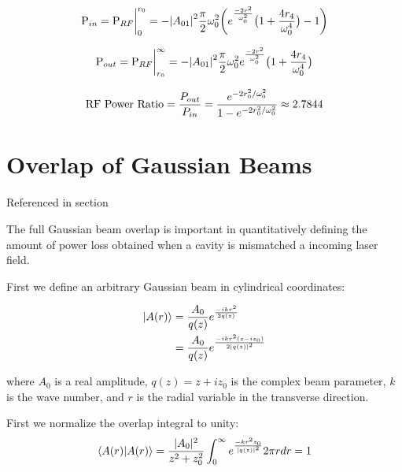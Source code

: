 \begin{appendices}
	\begin{equation}
	\text{P}_{in} \\
	= \text{P}_{RF} \biggr\rvert_0^{r_0} \\
	= - \abs{A_{01}}^2  \frac{\pi}{2} \omega_{0}^2 \bigg( e^{\frac{-2r^2}{\omega_{0}^2}} \big(1 + \frac{4 r_4}{\omega_{0}^4} \big) - 1 \bigg)
	\end{equation}
	
	\begin{equation}
	\text{P}_{out} \\
	= \text{P}_{RF} \biggr\rvert_{r_0}^{\infty}\\ 
	= - \abs{A_{01}}^2  \frac{\pi}{2} \omega_{0}^2 e^{\frac{-2r^2}{\omega_{0}^2}} \big(1 + \frac{4 r_4}{\omega_{0}^4} \big) 
	\end{equation}
	
	\begin{equation}
	\text{RF Power Ratio} 
	= \frac{P_{out}}{P_{in}} \\
	= \frac{e^{-2r_0^2/ \omega_{0}^2}} {1 - e^{-2r_0^2/ \omega_{0}^2 }} \approx 2.7844
	\end{equation}
	
	\chapter{Overlap of Gaussian Beams}
	
	Referenced in section
	
	The full Gaussian beam overlap is important in quantitatively defining the amount of power loss obtained when a cavity is mismatched a incoming laser field.
	
	First we define an arbitrary Gaussian beam in cylindrical coordinates:
	
	\begin{equation}
	\begin{split}
	\ket{A(r)} 
	&= \frac{A_0}{q(z)} e^{\frac{-ikr^2}{2q(z)}}\\
	&= \frac{A_0}{q(z)} e^{\frac{-ikr^2(z-iz_0)}{2\abs{q(z)}^2}}
	\end{split}
	\end{equation}
	
	where $A_0$ is a real amplitude, $q(z)= z + i z_0$ is the complex beam parameter, $k$ is the wave number, and $r$ is the radial variable in the transverse direction.

	First we normalize the overlap integral to unity:
	\begin{equation}
	\braket{A(r)|A(r)} 
	=  \frac{\rvert A_0 \rvert^2}{z^2+z_0^2} \int_{0}^{\infty} e^{\frac{-kr^2 z_0}{\abs{q(z)}^2}} 2 \pi r dr = 1
	\end{equation}


\end{appendices}
